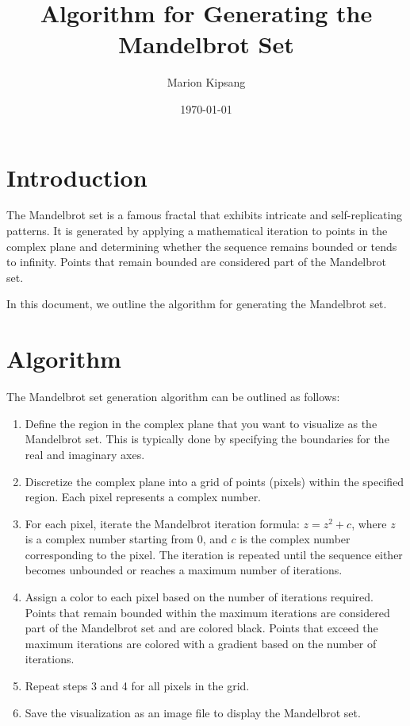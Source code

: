\documentclass{article}
\title{Algorithm for Generating the Mandelbrot Set}
\author{Marion Kipsang}
\date{\today}
\begin{document}
\maketitle

\section{Introduction}

The Mandelbrot set is a famous fractal that exhibits intricate and self-replicating patterns. It is generated by applying a mathematical iteration to points in the complex plane and determining whether the sequence remains bounded or tends to infinity. Points that remain bounded are considered part of the Mandelbrot set.

In this document, we outline the algorithm for generating the Mandelbrot set.

\section{Algorithm}

The Mandelbrot set generation algorithm can be outlined as follows:

\begin{enumerate}
\item Define the region in the complex plane that you want to visualize as the Mandelbrot set. This is typically done by specifying the boundaries for the real and imaginary axes.

\item Discretize the complex plane into a grid of points (pixels) within the specified region. Each pixel represents a complex number.

\item For each pixel, iterate the Mandelbrot iteration formula: $z = z^2 + c$, where $z$ is a complex number starting from $0$, and $c$ is the complex number corresponding to the pixel. The iteration is repeated until the sequence either becomes unbounded or reaches a maximum number of iterations.

\item Assign a color to each pixel based on the number of iterations required. Points that remain bounded within the maximum iterations are considered part of the Mandelbrot set and are colored black. Points that exceed the maximum iterations are colored with a gradient based on the number of iterations.

\item Repeat steps 3 and 4 for all pixels in the grid.

\item Save the visualization as an image file to display the Mandelbrot set.
\end{enumerate}
\end{document}
